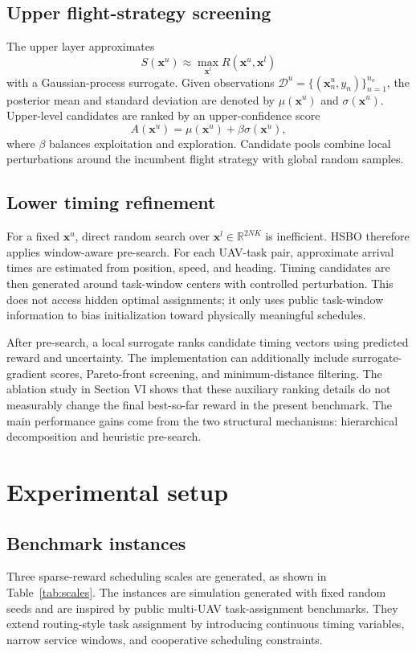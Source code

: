 \documentclass[twocolumn]{article}
\newcommand{\R}{\mathbb{R}}
\newcommand{\vect}[1]{\bm{#1}}
\begin{document}
\subsection{Upper flight-strategy screening}
The upper layer approximates
\begin{equation}
    S(\vect{x}^{u})\approx \max_{\vect{x}^{l}}R(\vect{x}^{u},\vect{x}^{l})
\end{equation}
with a Gaussian-process surrogate. Given observations $\mathcal{D}^{u}=\{(\vect{x}^{u}_n,y_n)\}_{n=1}^{n_o}$, the posterior mean and standard deviation are denoted by $\mu(\vect{x}^{u})$ and $\sigma(\vect{x}^{u})$. Upper-level candidates are ranked by an upper-confidence score
\begin{equation}
    A(\vect{x}^{u})=\mu(\vect{x}^{u})+\beta\sigma(\vect{x}^{u}),
\end{equation}
where $\beta$ balances exploitation and exploration. Candidate pools combine local perturbations around the incumbent flight strategy with global random samples.

\subsection{Lower timing refinement}
For a fixed $\vect{x}^{u}$, direct random search over $\vect{x}^{l}\in\R^{2NK}$ is inefficient. HSBO therefore applies window-aware pre-search. For each UAV-task pair, approximate arrival times are estimated from position, speed, and heading. Timing candidates are then generated around task-window centers with controlled perturbation. This does not access hidden optimal assignments; it only uses public task-window information to bias initialization toward physically meaningful schedules.

After pre-search, a local surrogate ranks candidate timing vectors using predicted reward and uncertainty. The implementation can additionally include surrogate-gradient scores, Pareto-front screening, and minimum-distance filtering. The ablation study in Section VI shows that these auxiliary ranking details do not measurably change the final best-so-far reward in the present benchmark. The main performance gains come from the two structural mechanisms: hierarchical decomposition and heuristic pre-search.

\section{Experimental setup}
\subsection{Benchmark instances}
Three sparse-reward scheduling scales are generated, as shown in Table~\ref{tab:scales}. The instances are simulation generated with fixed random seeds and are inspired by public multi-UAV task-assignment benchmarks. They extend routing-style task assignment by introducing continuous timing variables, narrow service windows, and cooperative scheduling constraints.
\end{document}
